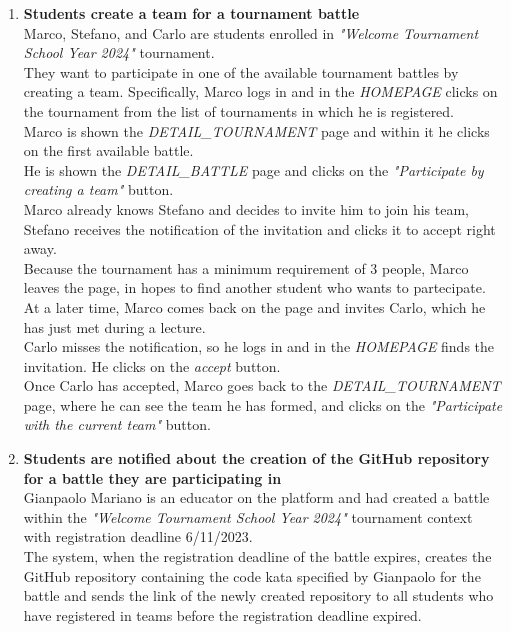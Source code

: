 \begin{enumerate}
	\item \textbf{Students create a team for a tournament battle}\\
	      Marco, Stefano, and Carlo are students enrolled in \emph{"Welcome Tournament School Year 2024"} tournament.\\
	      They want to participate in one of the available tournament battles by creating a team.
	      Specifically, Marco logs in and in the \emph{HOMEPAGE} clicks on the tournament from the list of tournaments in which he is registered.\\
	      Marco is shown the \emph{DETAIL\_TOURNAMENT} page and within it he clicks on the first available battle.\\
	      He is shown the \emph{DETAIL\_BATTLE} page and clicks on the \emph{"Participate by creating a team"} button.\\
	      Marco already knows Stefano and decides to invite him to join his team, Stefano receives the notification of the invitation and
	      clicks it to accept right away.\\
	      Because the tournament has a minimum requirement of 3 people, Marco leaves the page, in hopes to find another student who wants to partecipate.\\
	      At a later time, Marco comes back on the page and invites Carlo, which he has just met during a lecture.\\
	      Carlo misses the notification, so he logs in and in the \emph{HOMEPAGE} finds the invitation. He clicks on the
	      \emph{accept} button.\\
	      Once Carlo has accepted, Marco goes back to the \emph{DETAIL\_TOURNAMENT} page, where he can see the team he has formed,
	      and clicks on the \emph{"Participate with the current team"} button.

	\item \textbf{Students are notified about the creation of the GitHub repository for a battle they are participating in}\\
	      Gianpaolo Mariano is an educator on the platform and had created a battle within the \emph{"Welcome Tournament School Year 2024"} tournament context with registration deadline 6/11/2023.\\
	      The system, when the registration deadline of the battle expires, creates the GitHub repository containing the code kata specified by Gianpaolo for the battle and sends the link of the newly created repository to all students who have registered in teams before the registration deadline expired.



\end{enumerate}
